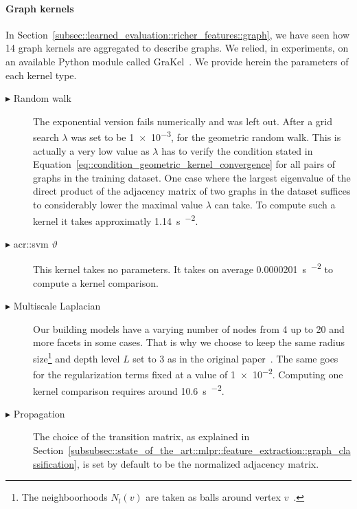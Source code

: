             \paragraph{Graph kernels}
                In Section~\ref{subsec::learned_evaluation::richer_features::graph}, we have seen how 14 graph kernels are aggregated to describe graphs.
                We relied, in experiments, on an available Python module called GraKel~\parencite{siglidis2018grakel}.
                We provide herein the parameters of each kernel type.
                \begin{description}
                    \item[\(\blacktriangleright\) Random walk] The exponential version fails numerically and was left out.
                                After a grid search \(\lambda\) was set to be \num[scientific-notation = true]{1e-3}, for the geometric random walk.
                                This is actually a very low value as \(\lambda\) has to verify the condition stated in Equation~\ref{eq::condition_geometric_kernel_convergence} for all pairs of graphs in the training dataset.
                                One case where the largest eigenvalue of the direct product of the adjacency matrix of two graphs in the dataset suffices to considerably lower the maximal value \(\lambda\) can take.
                                To compute such a kernel it takes approximatly \SI{1.14}{\s\per\building\squared}.
                    \item[\(\blacktriangleright\) \gls{acr::svm} \(\vartheta\)] This kernel takes no parameters.
                                It takes on average \SI[scientific-notation = true]{0.0000201}{\s\per\building\squared} to compute a kernel comparison.
                    \item[\(\blacktriangleright\) Multiscale Laplacian] Our building models have a varying number of nodes from 4 up to 20 and more facets in some cases.
                                That is why we choose to keep the same radius size\footnote{The neighboorhoods \(N_l(v)\) are taken as balls around vertex \(v\)~\parencite{kondor2016multiscale}.} and depth level \(L\) set to 3 as in the original paper~\parencite{kondor2016multiscale}.
                                The same goes for the regularization terms fixed at a value of \num[scientific-notation = true]{1e-2}.
                                Computing one kernel comparison requires around \SI{10.6}{\s\per\building\squared}.
                    \item[\(\blacktriangleright\) Propagation] The choice of the transition matrix, as explained in Section~\ref{subsubsec::state_of_the_art::mlpr::feature_extraction::graph_classification}, is set by default to be the normalized adjacency matrix.

\end{description}
